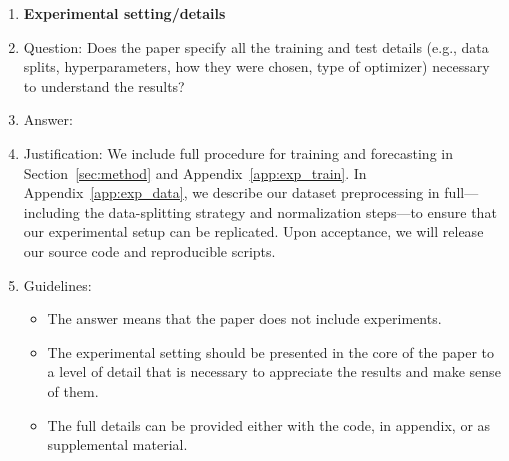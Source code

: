\documentclass{article}
\begin{document}
\begin{enumerate}
\item {\bf Experimental setting/details}
    \item[] Question: Does the paper specify all the training and test details (e.g., data splits, hyperparameters, how they were chosen, type of optimizer) necessary to understand the results?
    \item[] Answer: \answerYes{} %
    \item[] Justification: We include full procedure for training and forecasting in Section~\ref{sec:method} and Appendix~\ref{app:exp_train}. In Appendix~\ref{app:exp_data}, we describe our dataset preprocessing in full—including the data-splitting strategy and normalization steps—to ensure that our experimental setup can be replicated. Upon acceptance, we will release our source code and reproducible scripts.
    \item[] Guidelines:
    \begin{itemize}
        \item The answer \answerNA{} means that the paper does not include experiments.
        \item The experimental setting should be presented in the core of the paper to a level of detail that is necessary to appreciate the results and make sense of them.
        \item The full details can be provided either with the code, in appendix, or as supplemental material.
    \end{itemize}


\end{enumerate}
\end{document}
